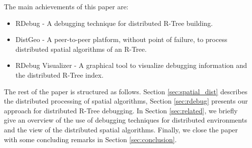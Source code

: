 The main achievements of this paper are:

\begin{itemize}
  \item RDebug - A debugging technique for distributed R-Tree building.
  \item DistGeo - A peer-to-peer platform, without point of failure, to process distributed spatial algorithms of an R-Tree.
  \item RDebug Visualizer - A graphical tool to visualize debugging information and the distributed R-Tree index.
\end{itemize}

The rest of the paper is structured as follows. Section \ref{sec:spatial_dist} describes the distributed processing of spatial algorithms, 
Section \ref{sec:rdebug} presents our approach for distributed R-Tree debugging. 
In Section \ref{sec:related}, we briefly give an overview of the use of debugging techniques for distributed environments and the view of the distributed spatial algorithms. 
Finally, we close the paper with some concluding remarks in Section \ref{sec:conclusion}.